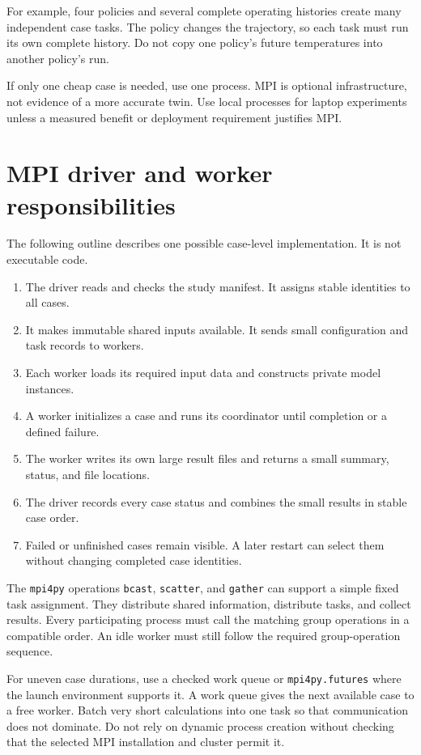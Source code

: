 \documentclass[11pt,a4paper]{report}
\begin{document}
For example, four policies and several complete operating histories create many independent case tasks.
The policy changes the trajectory, so each task must run its own complete history.
Do not copy one policy's future temperatures into another policy's run.

If only one cheap case is needed, use one process.
MPI is optional infrastructure, not evidence of a more accurate twin.
Use local processes for laptop experiments unless a measured benefit or deployment requirement justifies MPI.

\section{MPI driver and worker responsibilities}
The following outline describes one possible case-level implementation.
It is not executable code.
\begin{enumerate}
\item The driver reads and checks the study manifest. It assigns stable identities to all cases.
\item It makes immutable shared inputs available. It sends small configuration and task records to workers.
\item Each worker loads its required input data and constructs private model instances.
\item A worker initializes a case and runs its coordinator until completion or a defined failure.
\item The worker writes its own large result files and returns a small summary, status, and file locations.
\item The driver records every case status and combines the small results in stable case order.
\item Failed or unfinished cases remain visible. A later restart can select them without changing completed case identities.
\end{enumerate}

The \texttt{mpi4py} operations \texttt{bcast}, \texttt{scatter}, and \texttt{gather} can support a simple fixed task assignment.
They distribute shared information, distribute tasks, and collect results.
Every participating process must call the matching group operations in a compatible order.
An idle worker must still follow the required group-operation sequence.

For uneven case durations, use a checked work queue or \texttt{mpi4py.futures} where the launch environment supports it.
A work queue gives the next available case to a free worker.
Batch very short calculations into one task so that communication does not dominate.
Do not rely on dynamic process creation without checking that the selected MPI installation and cluster permit it.
\end{document}
